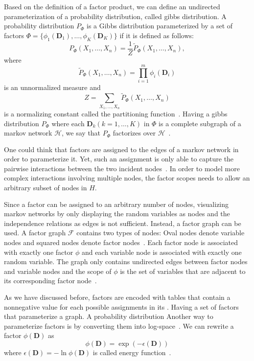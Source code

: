 Based on the definition of a \gls{factor product}, we can define an undirected parameterization of a \gls{probability distribution}, called \gls{gibbs distribution}.
A \gls{probability distribution} $P_{\Phi}$ is a Gibbs distribution parameterized by a set of \glspl{factor} $\Phi=\{\phi_1(\bm{D}_1),\dots,\phi_K(\bm{D}_K)\}$ if it is defined as follows:
\begin{equation*}
  P_{\Phi}(X_1,\dots,X_n)=\frac{1}{Z}\tilde{P}_{\Phi}(X_1,\dots,X_n),
\end{equation*}
where
\begin{equation*}
  \tilde{P}_{\Phi}(X_1,\dots,X_n)=\prod_{i=1}^{m}\phi_i(\bm{D}_i)
\end{equation*}
is an unnormalized measure and
\begin{equation*}
  Z=\sum_{X_1,\ldots,X_n}\tilde{P}_{\Phi}(X_1,\dots,X_n)
\end{equation*}
is a normalizing constant called the \gls{partitioning function}~\citep{koller2009probabilistic}.
Having a \gls{gibbs distribution} $P_\Phi$ where each $\bm{D}_k(k=1,\dots,K)$ in $\Phi$ is a complete subgraph of a \gls{markov network} $\mathcal{H}$, we say that $P_\Phi$ factorizes over $\mathcal{H}$~\citep{koller2009probabilistic}.

One could think that \glspl{factor} are assigned to the edges of a \gls{markov network} in order to parameterize it.
Yet, such an assignment is only able to capture the pairwise interactions between the two incident nodes~\citep{koller2009probabilistic}.
In order to model more complex interactions involving multiple nodes, the \glspl{factor scope} needs to allow an arbitrary subset of nodes in $H$.

Since a factor can be assigned to an arbitrary number of nodes, visualizing \glspl{markov network} by only displaying the random variables as nodes and the independence relations as edges is not sufficient.
Instead, a \gls{factor graph} can be used.
A \gls{factor graph} $\mathcal{F}$ contains two types of nodes: Oval nodes denote variable nodes and squared nodes denote factor nodes~\citep{koller2009probabilistic}.
Each factor node is associated with exactly one factor $\phi$ and each variable node is associated with exactly one random variable.
The graph only contains undirected edges between factor nodes and variable nodes and the scope of $\phi$ is the set of variables that are adjacent to its corresponding factor node~\citep{koller2009probabilistic}.

As we have discussed before, \glspl{factor} are encoded with tables that contain a nonnegative value for each possible assignments in its .
Having a set of \glspl{factor} that parameterize a graph. A probability distribution
Another way to parameterize \glspl{factor} is by converting them into log-space~\citep{koller2009probabilistic}.
We can rewrite a factor $\phi(\bm{D})$ as
\begin{equation*}
  \phi(\bm{D}) = \exp(-\epsilon(\bm{D}))
\end{equation*}
where $\epsilon(\bm{D})=-\ln\phi(\bm{D})$ is called \gls{energy function}~\citep{koller2009probabilistic}.

